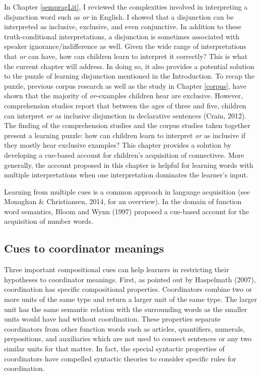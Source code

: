 \documentclass[floatsintext,man]{apa6}
\theoremstyle{definition}
\theoremstyle{definition}
\theoremstyle{definition}
\theoremstyle{remark}
\begin{document}
In Chapter \ref{sempragLit}, I reviewed the complexities involved in
interpreting a disjunction word such as \emph{or} in English. I showed
that a disjunction can be interpreted as inclusive, exclusive, and even
conjunctive. In addition to these truth-conditional interpretations, a
disjunction is sometimes associated with speaker ignorance/indifference
as well. Given the wide range of interpretations that \emph{or} can
have, how can children learn to interpret it correctly? This is what the
current chapter will address. In doing so, it also provides a potential
solution to the puzzle of learning disjunction mentioned in the
Introduction. To recap the puzzle, previous corpus research as well as
the study in Chapter \ref{corpus}, have shown that the majority of
\emph{or}-examples children hear are exclusive. However, comprehension
studies report that between the ages of three and five, children can
interpret \emph{or} as inclusive disjunction in declarative sentences
(Crain, 2012). The finding of the comprehension studies and the corpus
studies taken together present a learning puzzle: how can children learn
to interpret \emph{or} as inclusive if they mostly hear exclusive
examples? This chapter provides a solution by developing a cue-based
account for children's acquisition of connectives. More generally, the
account proposed in this chapter is helpful for learning words with
multiple interpretations when one interpretation dominates the learner's
input.

Learning from multiple cues is a common approach in language acquisition
(see Monaghan \& Christiansen, 2014, for an overview). In the domain of
function word semantics, Bloom and Wynn (1997) proposed a cue-based
account for the acquisition of number words.

\subsection{Cues to coordinator
meanings}\label{cues-to-coordinator-meanings}

Three important compositional cues can help learners in restricting
their hypotheses to coordinator meanings. First, as pointed out by
Haspelmath (2007), coordination has specific compositional properties.
Coordinators combine two or more units of the same type and return a
larger unit of the same type. The larger unit has the same semantic
relation with the surrounding words as the smaller units would have had
without coordination. These properties separate coordinators from other
function words such as articles, quantifiers, numerals, prepositions,
and auxiliaries which are not used to connect sentences or any two
similar units for that matter. In fact, the special syntactic properties
of coordinators have compelled syntactic theories to consider specific
rules for coordination.
\end{document}
